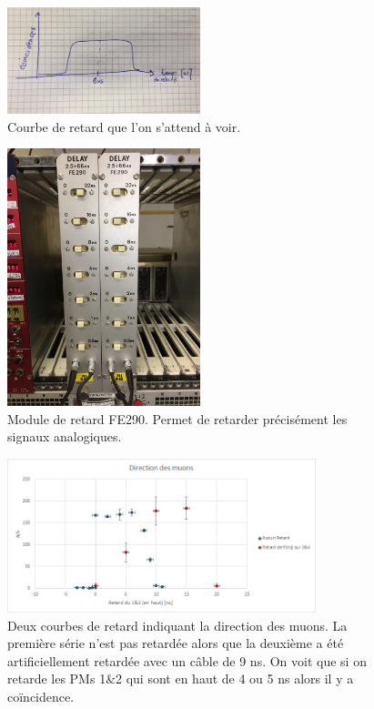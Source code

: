 \documentclass[12pt]{article}
\begin{document}
\begin{figure}[htpb!]
    \centering
    \includegraphics[width=0.5\textwidth]{Images/Schemas/CourbeDeRetard.jpg}
    \caption{Courbe de retard que l'on s'attend à voir.}
    \label{fig:Schema_Courbe_de_retard}
\end{figure}

\begin{figure}[htpb!]
    \centering
    \includegraphics[width=0.5\textwidth]{Images/Photos/Delay2.jpg}
    \caption{Module de retard FE290. Permet de retarder précisément les signaux analogiques.}
    \label{fig:Delay}
\end{figure}

\begin{figure}[htpb!]
    \centering
    \includegraphics[width=0.8\textwidth]{graphiques/experience2/DirectionMuons.png}
    \caption{Deux courbes de retard indiquant la direction des muons. La première série n'est pas retardée alors que la deuxième a été artificiellement retardée avec un câble de 9 ns. On voit que si on retarde les PMs 1\&2 qui sont en haut de 4 ou 5 ns alors il y a coïncidence.}
    \label{fig:CourbeRetard}
\end{figure}
\end{document}
